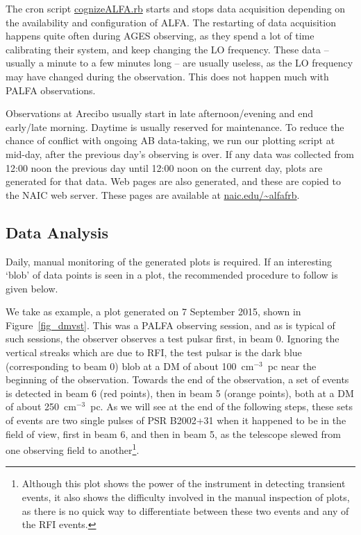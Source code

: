 \documentclass{article}
\begin{document}
The cron script \url{cognizeALFA.rb} starts and stops data acquisition
depending on the availability and configuration of ALFA. The restarting of data
acquisition happens quite often during AGES observing, as they spend a lot of
time calibrating their system, and keep changing the LO frequency. These data
-- usually a minute to a few minutes long -- are usually useless, as the LO
frequency may have changed during the observation. This does not happen much
with PALFA observations.

Observations at Arecibo usually start in late afternoon/evening and end
early/late morning. Daytime is usually reserved for maintenance. To reduce
the chance of conflict with ongoing AB data-taking, we run our plotting script
at mid-day, after the previous day's observing is over. If any data was
collected from 12:00 noon the previous day until 12:00 noon on the current day,
plots are generated for that data. Web pages are also generated, and these are
copied to the NAIC web server. These pages are available at
\url{naic.edu/~alfafrb}.

\subsection{Data Analysis}

Daily, manual monitoring of the generated plots is required. If an interesting
`blob' of data points is seen in a plot, the recommended procedure to follow is
given below.

We take as example, a plot generated on 7 September 2015, shown in
Figure~\ref{fig_dmvst}. This was a PALFA observing session, and as is typical
of such sessions, the observer observes a test pulsar first, in beam 0.
Ignoring the vertical streaks which are due to RFI, the test pulsar is the dark
blue (corresponding to beam 0) blob at a DM of about 100~cm$^{-3}$~pc near the
beginning of the observation. Towards the end of the observation, a set of
events is detected in beam 6 (red points), then in beam 5 (orange points), both
at a DM of about 250~cm$^{-3}$~pc. As we will see at the end of the following
steps, these sets of events are two single pulses of PSR B2002+31 when it
happened to be in the field of view, first in beam 6, and then in beam 5, as
the telescope slewed from one observing field to another\footnote{Although this
plot shows the power of the instrument in detecting transient events, it also
shows the difficulty involved in the manual inspection of plots, as there is no
quick way to differentiate between these two events and any of the RFI
events.}.
\end{document}

